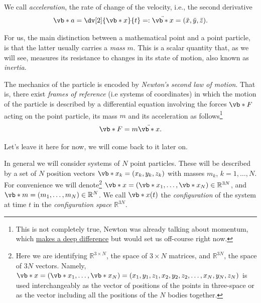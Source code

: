 \documentclass[english,fontsize=11pt,paper=b5]{scrbook}
\theoremstyle{definition}
\begin{document}
  We call \emph{acceleration}, the rate of change of the velocity, i.e., the second derivative
  \begin{equation}
    \vb*{a} = \dv[2]{\vb*{x}}{t} =: \ddot{\vb*{x}} = (\ddot{x}, \ddot{y}, \ddot{z}).
  \end{equation}

  For us, the main distinction between a mathematical point and a point particle, is that the latter usually carries a \emph{mass} $m$. This is a scalar quantity that, as we will see, measures its resistance to changes in its state of motion, also known as \emph{inertia}.

  \begin{tcolorbox}
    The mechanics of the particle is encoded by \emph{Newton's second law of motion}.
    That is, there exist \emph{frames of reference} (i.e systems of coordinates) in which the motion of the particle is described by a differential equation involving the forces $\vb*{F}$ acting on the point particle, its mass $m$ and its acceleration as follows\footnote{This is not completely true, Newton was already talking about momentum, which \href{https://web.archive.org/web/20211201082909/https://bigthink.com/starts-with-a-bang/most-important-equation-physics/}{makes a deep difference} but would set us off-course right now.}
    \begin{equation}\label{eq:newton}
      \vb* F = m \ddot{\vb*{x}}.
    \end{equation}
  \end{tcolorbox}
  Let's leave it here for now, we will come back to it later on.
  \medskip

  In general we will consider systems of $N$ point particles.
  These will be described by a set of $N$ position vectors $\vb*{x}_k = (x_k, y_k ,z_k)$ with masses $m_k$, $k = 1, \ldots, N$.
  For convenience we will denote\footnote{Here we are identifying $\mathbb{R}^{3\times N}$, the space of $3\times N$ matrices, and $\mathbb{R}^{3N}$, the space of $3N$ vectors. Namely, $\vb*{x} = (\vb*{x}_1, \ldots, \vb*{x}_N) = (x_1, y_1, z_1, x_2, y_2, z_2, \ldots, x_N, y_N, z_N)$ is used interchangeably as the vector of positions of the points in three-space or as the vector including all the positions of the $N$ bodies together.} $\vb*{x} = (\vb*{x}_1, \ldots, \vb*{x}_N)\in\mathbb{R}^{3N}$, and $\vb*{m} = (m_1, \ldots, m_N)\in\mathbb{R}^N$.
  We call $\vb*{x}(t)$ the \emph{configuration} of the system at time $t$ in the \emph{configuration space} $\mathbb{R}^{3N}$.
\end{document}
